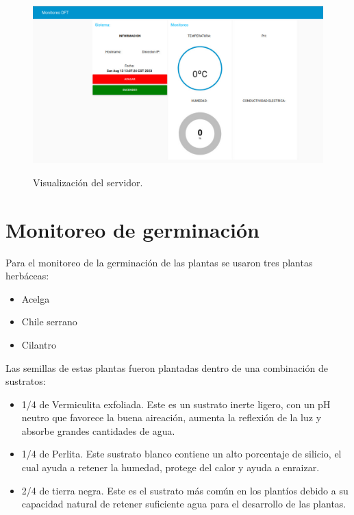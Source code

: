 \begin{figure}[H]
\centering
         \includegraphics[scale=0.55]{imgs/NODE-RED_2.png} \\
    \caption{Visualización del servidor.}\label{Node_2}
\end{figure}

\section{Monitoreo de germinación}
Para el monitoreo de la germinación de las plantas se usaron tres plantas herbáceas: 
\begin{itemize}
    \item Acelga
    \item Chile serrano
    \item Cilantro
\end{itemize}

Las semillas de estas plantas fueron plantadas dentro de una combinación de sustratos:
\begin{itemize}
    \item 1/4 de Vermiculita exfoliada. Este es un sustrato inerte ligero, con un pH neutro que favorece la buena aireación, aumenta la reflexión de la luz y absorbe grandes cantidades de agua.

    \item 1/4 de Perlita. Este sustrato blanco contiene un alto porcentaje de silicio, el cual ayuda a retener la humedad, protege del calor y ayuda a enraizar.
    \item 2/4 de tierra negra. Este es el sustrato más común en los plantíos debido a su capacidad natural de retener suficiente agua para el desarrollo de las plantas.
\end{itemize}


